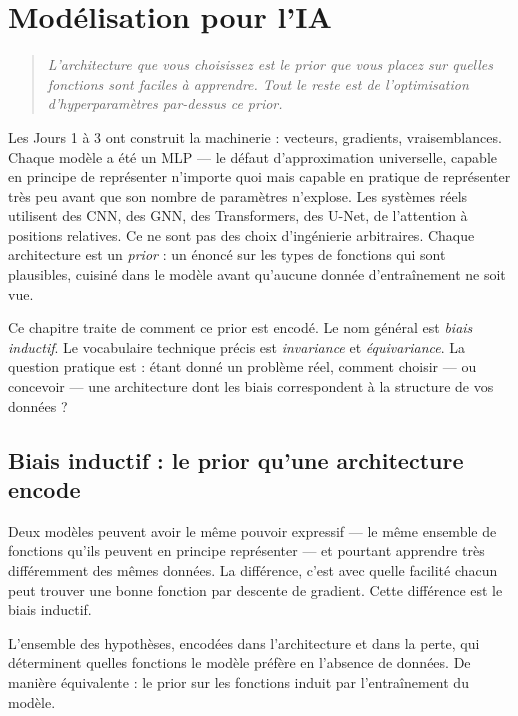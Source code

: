 \chapter{Modélisation pour l'IA}
\label{ch:jour4}

\begin{quote}
\emph{\og L'architecture que vous choisissez est le prior que vous placez sur quelles fonctions sont faciles à apprendre. Tout le reste est de l'optimisation d'hyperparamètres par-dessus ce prior. \fg}
\end{quote}

Les Jours 1 à 3 ont construit la machinerie : vecteurs, gradients, vraisemblances. Chaque modèle a été un MLP --- le défaut d'approximation universelle, capable en principe de représenter n'importe quoi mais capable en pratique de représenter très peu avant que son nombre de paramètres n'explose. Les systèmes réels utilisent des CNN, des GNN, des Transformers, des U-Net, de l'attention à positions relatives. Ce ne sont pas des choix d'ingénierie arbitraires. Chaque architecture est un \emph{prior} : un énoncé sur les types de fonctions qui sont plausibles, cuisiné dans le modèle avant qu'aucune donnée d'entraînement ne soit vue.

Ce chapitre traite de comment ce prior est encodé. Le nom général est \emph{biais inductif}. Le vocabulaire technique précis est \emph{invariance} et \emph{équivariance}. La question pratique est : étant donné un problème réel, comment choisir --- ou concevoir --- une architecture dont les biais correspondent à la structure de vos données ?

\section{Biais inductif : le prior qu'une architecture encode}

Deux modèles peuvent avoir le même pouvoir expressif --- le même ensemble de fonctions qu'ils peuvent en principe représenter --- et pourtant apprendre très différemment des mêmes données. La différence, c'est avec quelle facilité chacun peut trouver une bonne fonction par descente de gradient. Cette différence est le biais inductif.

\begin{definition}
L'ensemble des hypothèses, encodées dans l'architecture et dans la perte, qui déterminent quelles fonctions le modèle préfère en l'absence de données. De manière équivalente : le prior sur les fonctions induit par l'entraînement du modèle.
\end{definition}

